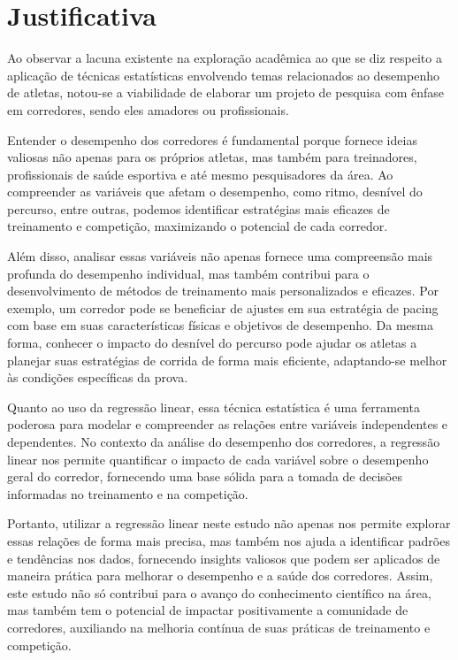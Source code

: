 \section{Justificativa}

Ao observar a lacuna existente na exploração acadêmica ao que se diz respeito a aplicação de técnicas estatísticas envolvendo temas relacionados ao desempenho de atletas, notou-se a viabilidade de elaborar um projeto de pesquisa com ênfase em corredores, sendo eles amadores ou profissionais. 

Entender o desempenho dos corredores é fundamental porque fornece ideias valiosas não apenas para os próprios atletas, mas também para treinadores, profissionais de saúde esportiva e até mesmo pesquisadores da área. Ao compreender as variáveis que afetam o desempenho, como ritmo, desnível do percurso, entre outras, podemos identificar estratégias mais eficazes de treinamento e competição, maximizando o potencial de cada corredor.

Além disso, analisar essas variáveis não apenas fornece uma compreensão mais profunda do desempenho individual, mas também contribui para o desenvolvimento de métodos de treinamento mais personalizados e eficazes. Por exemplo, um corredor pode se beneficiar de ajustes em sua estratégia de pacing com base em suas características físicas e objetivos de desempenho. Da mesma forma, conhecer o impacto do desnível do percurso pode ajudar os atletas a planejar suas estratégias de corrida de forma mais eficiente, adaptando-se melhor às condições específicas da prova.

Quanto ao uso da regressão linear, essa técnica estatística é uma ferramenta poderosa para modelar e compreender as relações entre variáveis independentes e dependentes. No contexto da análise do desempenho dos corredores, a regressão linear nos permite quantificar o impacto de cada variável sobre o desempenho geral do corredor, fornecendo uma base sólida para a tomada de decisões informadas no treinamento e na competição.

Portanto, utilizar a regressão linear neste estudo não apenas nos permite explorar essas relações de forma mais precisa, mas também nos ajuda a identificar padrões e tendências nos dados, fornecendo insights valiosos que podem ser aplicados de maneira prática para melhorar o desempenho e a saúde dos corredores. Assim, este estudo não só contribui para o avanço do conhecimento científico na área, mas também tem o potencial de impactar positivamente a comunidade de corredores, auxiliando na melhoria contínua de suas práticas de treinamento e competição.
